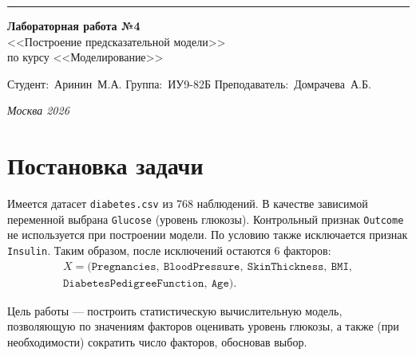 \documentclass[a4paper, 14pt]{extarticle}
\begin{document}
\begin{titlepage}
\vspace*{-16pt}
\hspace{30pt}\rule{0.866\textwidth}{0.4pt}

\vspace{11em}

\begin{center}
\Large {\bf Лабораторная работа №4} \\ 
\large <<Построение предсказательной модели>> \\
\large {по курсу <<Моделирование>>} \\

\end{center}\normalsize

\vspace{8em}

\vbox{%
\hfill%
\vbox{%
\hbox{Студент: Аринин М.А.}%
\hbox{Группа: ИУ9-82Б}%
\hbox{Преподаватель: Домрачева А.Б.}%
}%
} 

\bigskip

\vfill


\begin{center}
\textsl{Москва 2026}
\end{center}
\end{titlepage}


\renewcommand{\ttdefault}{pcr}

\setlength{\tabcolsep}{3pt}

\newpage
\setcounter{page}{2}

\section{Постановка задачи}

Имеется датасет \texttt{diabetes.csv} из 768 наблюдений. В качестве зависимой переменной выбрана
\texttt{Glucose} (уровень глюкозы). Контрольный признак \texttt{Outcome} не используется при построении модели.
По условию также исключается признак \texttt{Insulin}. Таким образом, после исключений остаются 6 факторов:
\[
\begin{multlined}
X = (\texttt{Pregnancies},\ \texttt{BloodPressure},\ \texttt{SkinThickness},\ \texttt{BMI},\\
\texttt{DiabetesPedigreeFunction},\ \texttt{Age}).
\end{multlined}
\]

Цель работы --- построить статистическую вычислительную модель, позволяющую по значениям факторов
оценивать уровень глюкозы, а также (при необходимости) сократить число факторов, обосновав выбор.
\end{document}
